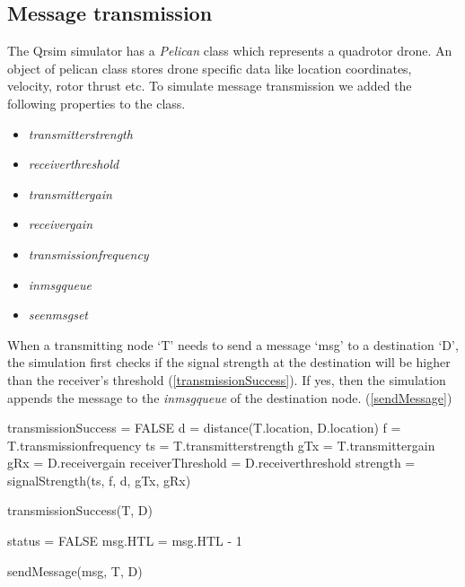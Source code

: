 \subsection{Message transmission}

The Qrsim simulator has a \emph{Pelican} class which represents a quadrotor drone. An object of pelican class stores drone specific data like location coordinates, velocity, rotor thrust etc. To simulate message transmission we added the following properties to the class.
\begin{itemize}
\item \emph{transmitter\textunderscore strength}
\item \emph{receiver\textunderscore threshold}
\item \emph{transmitter\textunderscore gain}
\item \emph{receiver\textunderscore gain}
\item \emph{transmission\textunderscore frequency}
\item \emph{in\textunderscore msg\textunderscore queue}
\item \emph{seen\textunderscore msg\textunderscore set}
\end{itemize}

When a transmitting node `T' needs to send a message `msg' to a destination `D', the simulation first checks if the signal strength at the destination will be higher than the receiver's threshold (\ref{transmissionSuccess}). If yes, then the simulation appends the message to the \emph{in\textunderscore msg\textunderscore queue} of the destination node. (\ref{sendMessage})

\begin{algorithm}
\SetAlgoLined
\DontPrintSemicolon
{}
transmissionSuccess = FALSE\;
d = distance(T.location, D.location)\;
f = T.transmission\textunderscore frequency\;
ts = T.transmitter\textunderscore strength\;
gTx = T.transmitter\textunderscore gain\;
gRx = D.receiver\textunderscore gain\;
receiverThreshold = D.receiver\textunderscore threshold\;
strength = signalStrength(ts, f, d, gTx, gRx)\;

\caption{transmissionSuccess(T, D)} \label{transmissionSuccess}
\end{algorithm}

\begin{algorithm}
\DontPrintSemicolon
status = FALSE\;
msg.HTL = msg.HTL - 1\;

\caption{sendMessage(msg, T, D)} \label{sendMessage}
\end{algorithm}


